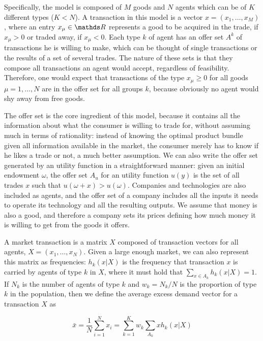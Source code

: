 Specifically, the model is composed of $M$ goods and $N$ agents which can be of $K$ different types ($K < N$). A transaction in this model is a vector $x = (x_1, \ldots, x_M)$, where an entry $x_\mu \in \R$ represents a good to be acquired in the trade, if $x_\mu > 0$ or traded away, if $x_\mu < 0$. Each type $k$ of agent has an offer set $A^k$ of transactions he is willing to make, which can be thought of single transactions or the results of a set of several trades. The nature of these sets is that they compose all transactions an agent would accept, regardless of feasibility. Therefore, one would expect that transactions of the type $x_\mu \geq 0$ for all goods $\mu = 1, \ldots, N$ are in the offer set for all groups $k$, because obviously no agent would shy away from free goods. 

The offer set is the core ingredient of this model, because it contains all the information about what the consumer is willing to trade for, without assuming much in terms of rationality: instead of knowing the optimal product bundle given all information available in the market, the consumer merely has to know if he likes a trade or not, a much better assumption. We can also write the offer set generated by an utility function in a straightforward manner: given an initial endowment $\omega$, the offer set $A_u$ for an utility function $u(y)$ is the set of all trades $x$ such that $u(\omega + x) > u(\omega)$. Companies and technologies are also included as agents, and the offer set of a company includes all the inputs it needs to operate its technology and all the resulting outputs. We assume that money is also a good, and therefore a company sets its prices defining how much money it is willing to get from the goods it offers. %

A market transaction is a matrix $X$ composed of transaction vectors for all agents, $X = (x_1, \ldots, x_N)$. Given a large enough market, we can also represent this matrix as frequencies: $h_k(x | X)$ is the frequency that transaction $x$ is carried by agents of type $k$ in $X$, where it must hold that $\sum_{x\in A_k} h_k (x | X) = 1$. If $N_k$ is the number of agents of type $k$ and $w_k = N_k / N$ is the proportion of type $k$ in the population, then we define the average excess demand vector for a transaction $X$ as

\begin{equation}
\label{eq:avg_excess_demand_foley}
    \bar{x} = \frac{1}{N} \sum_{i=1}^N x_i = \sum_{k=1}^K w_k \sum_{A_k} x h_k(x | X)
\end{equation}

